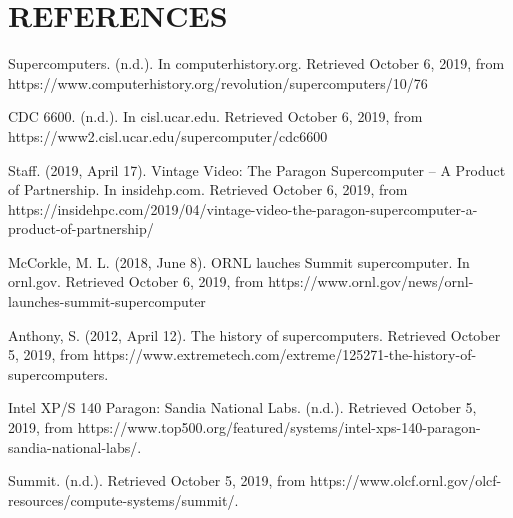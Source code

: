 \documentclass[letterpaper, 10 pt, conference]{IEEEconf}
\begin{document}

\section*{REFERENCES}

\begin{enumerate}[label={[\arabic*]}]
\item Supercomputers. (n.d.). In computerhistory.org. Retrieved October 6, 2019, from https://www.computerhistory.org/revolution/supercomputers/10/76
\item CDC 6600. (n.d.). In cisl.ucar.edu. Retrieved October 6, 2019, from https://www2.cisl.ucar.edu/supercomputer/cdc6600
\item Staff. (2019, April 17). Vintage Video: The Paragon Supercomputer – A Product of Partnership. In insidehp.com. Retrieved October 6, 2019, from https://insidehpc.com/2019/04/vintage-video-the-paragon-supercomputer-a-product-of-partnership/
\item McCorkle, M. L. (2018, June 8). ORNL lauches Summit supercomputer. In ornl.gov. Retrieved October 6, 2019, from https://www.ornl.gov/news/ornl-launches-summit-supercomputer
\item Anthony, S. (2012, April 12). The history of supercomputers. Retrieved October 5, 2019, from https://www.extremetech.com/extreme/125271-the-history-of-supercomputers.
\item Intel XP/S 140 Paragon: Sandia National Labs. (n.d.). Retrieved October 5, 2019, from https://www.top500.org/featured/systems/intel-xps-140-paragon-sandia-national-labs/.
\item Summit. (n.d.). Retrieved October 5, 2019, from https://www.olcf.ornl.gov/olcf-resources/compute-systems/summit/.
\end{enumerate}
\end{document}
